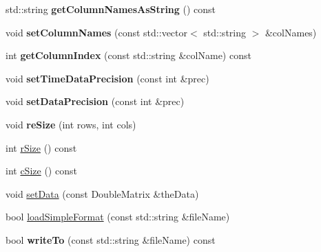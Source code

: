 \begin{DoxyCompactItemize}
\item 
\hypertarget{classrr_1_1_road_runner_data_a12015de9d9a181f7d4f44ca030c87eb3}{std\-::string {\bfseries get\-Column\-Names\-As\-String} () const }\label{classrr_1_1_road_runner_data_a12015de9d9a181f7d4f44ca030c87eb3}

\item 
\hypertarget{classrr_1_1_road_runner_data_a2b8a0b91625c4401e3aa6475cda8ff4d}{void {\bfseries set\-Column\-Names} (const std\-::vector$<$ std\-::string $>$ \&col\-Names)}\label{classrr_1_1_road_runner_data_a2b8a0b91625c4401e3aa6475cda8ff4d}

\item 
\hypertarget{classrr_1_1_road_runner_data_a194cbcd83e7061dab651f3d69486fd23}{int {\bfseries get\-Column\-Index} (const std\-::string \&col\-Name) const }\label{classrr_1_1_road_runner_data_a194cbcd83e7061dab651f3d69486fd23}

\item 
\hypertarget{classrr_1_1_road_runner_data_a46f8855d9846a4a37119207089d0076e}{void {\bfseries set\-Time\-Data\-Precision} (const int \&prec)}\label{classrr_1_1_road_runner_data_a46f8855d9846a4a37119207089d0076e}

\item 
\hypertarget{classrr_1_1_road_runner_data_a08c080a6697054db157cf129b88df5ef}{void {\bfseries set\-Data\-Precision} (const int \&prec)}\label{classrr_1_1_road_runner_data_a08c080a6697054db157cf129b88df5ef}

\item 
\hypertarget{classrr_1_1_road_runner_data_a1dbe710a51790160c8e8e726237c3668}{void {\bfseries re\-Size} (int rows, int cols)}\label{classrr_1_1_road_runner_data_a1dbe710a51790160c8e8e726237c3668}

\item 
int \hyperlink{classrr_1_1_road_runner_data_a41f3e6d0877138b1c0a8879a57dbc82f}{r\-Size} () const 
\item 
int \hyperlink{classrr_1_1_road_runner_data_ad5bfc0431c7c754b5ed5888aed7abc92}{c\-Size} () const 
\item 
void \hyperlink{classrr_1_1_road_runner_data_af3eb1531027cd5a189c2995598d6f9c1}{set\-Data} (const Double\-Matrix \&the\-Data)
\item 
bool \hyperlink{classrr_1_1_road_runner_data_a0c2069f9120a466864734342c39eb70e}{load\-Simple\-Format} (const std\-::string \&file\-Name)
\item 
\hypertarget{classrr_1_1_road_runner_data_a5af82bc4ff19399648820ec780735e2c}{bool {\bfseries write\-To} (const std\-::string \&file\-Name) const }\label{classrr_1_1_road_runner_data_a5af82bc4ff19399648820ec780735e2c}


\end{DoxyCompactItemize}

